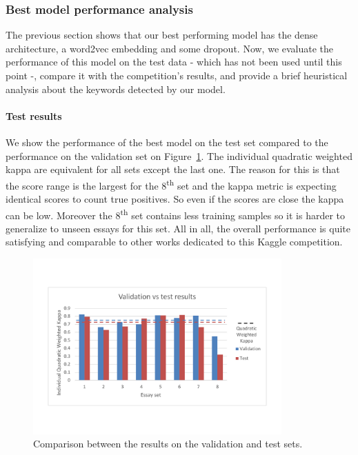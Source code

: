\documentclass[a4paper,12pt,english]{article}
\begin{document}
\subsubsection{Best model performance analysis}
The previous section shows that our best performing model has the dense architecture, a word2vec embedding and some dropout. Now, we evaluate the performance of this model on the test data - which has not been used until this point -, compare it with the competition's results, and provide a brief heuristical analysis about the keywords detected by our model.

\paragraph{Test results} We show the performance of the best model on the test set compared to the performance on the validation set on Figure~\ref{fig:testresults}. The individual quadratic weighted kappa are equivalent for all sets except the last one. The reason for this is that the score range is the largest for the 8\textsuperscript{th} set and the kappa metric is expecting identical scores to count true positives. So even if the scores are close the kappa can be low. Moreover the 8\textsuperscript{th} set contains less training samples so it is harder to generalize to unseen essays for this set. All in all, the overall performance is quite satisfying and comparable to other works dedicated to this Kaggle competition.

\begin{figure}
\vspace*{-1.5cm}
\includegraphics[width=0.85\textwidth]{fig/test.pdf}
\caption{Comparison between the results on the validation and test sets.}
\label{fig:testresults}
\end{figure}
\end{document}
